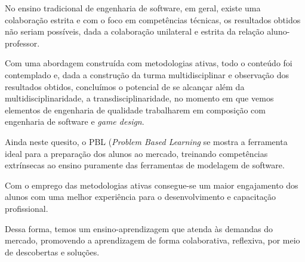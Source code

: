 \documentclass[12pt, onecolumn]{IEEEtran}
\begin{document}
No ensino tradicional de engenharia de software, em geral, existe uma colaboração estrita e com o foco em competências técnicas, os resultados obtidos não seriam possíveis, dada a colaboração unilateral e estrita da relação aluno-professor. 

Com uma abordagem construída com metodologias ativas, todo o conteúdo foi contemplado e, dada a construção da turma multidisciplinar e observação dos resultados obtidos, concluímos o potencial de se alcançar além da multidisciplinaridade, a transdisciplinaridade, no momento em que vemos elementos de engenharia de qualidade trabalharem em composição com engenharia de software e \textit{game design}. 

Ainda neste quesito, o PBL (\textit{Problem Based Learning} se mostra a ferramenta ideal para a preparação dos alunos ao mercado, treinando competências extrínsecas ao ensino puramente das ferramentas de modelagem de software.

Com o emprego das metodologias ativas consegue-se um maior engajamento dos alunos com uma melhor experiência para o desenvolvimento e capacitação profissional. 

Dessa forma, temos um ensino-aprendizagem que atenda às demandas do mercado, promovendo a aprendizagem de forma colaborativa, reflexiva, por meio de descobertas e soluções. 

%


\end{document}
